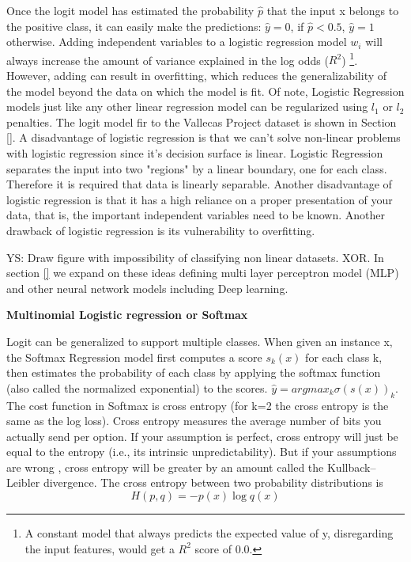 \documentclass[11pt]{article}
\theoremstyle{definition}
\theoremstyle{remark}
\begin{document}
{Once the logit model has estimated the probability $\hat{p}$ that the input x belongs to the positive class, it can easily make the predictions: $\hat{y} = 0$, if $\hat{p} < 0.5$, $\hat{y} = 1$ otherwise. Adding independent variables to a logistic regression model $w_i$ will always increase the amount of variance explained in the log odds ($R^2$) \footnote{A constant model that always predicts the expected value of y, disregarding the input features, would get a $R^2$ score of 0.0.}. However, adding can result in overfitting, which reduces the generalizability of the model beyond the data on which the model is fit. Of note, Logistic Regression models just like any other linear regression model can be regularized using $l_1$ or $l_2$ penalties. The logit model fir to the Vallecas Project dataset is shown in Section \ref{}.
A disadvantage of logistic regression is that we can’t solve non-linear problems with logistic regression since it’s decision surface is linear. 
Logistic Regression separates the input into two "regions" by a linear boundary, one for each class. Therefore it is required that data is linearly separable. Another disadvantage of logistic regression is that it has a high reliance on a proper presentation of your data, that is, the important independent variables need to be known. 
Another drawback of logistic regression is its vulnerability to overfitting.

YS: Draw figure with impossibility of classifying non linear datasets. XOR. In section \ref{} we expand on these ideas defining multi layer perceptron model (MLP) and other neural network models including Deep learning.

\textbf{Multinomial Logistic regression or Softmax}

Logit can be generalized to support multiple classes. When given an instance x, the Softmax Regression model first computes a score $s_{k}(x)$ for each class k, then estimates the probability of each class by applying the softmax function (also called the normalized exponential) to the scores. $\hat{y}= argmax_{k} \sigma(s(x))_k$. The cost function in Softmax is cross entropy (for k=2 the cross entropy is the same as the log loss). Cross entropy measures the average number of bits you actually send per option. If your assumption is perfect, cross entropy will just be equal to the entropy (i.e., its intrinsic unpredictability). But if your assumptions are wrong , cross entropy will be greater by an amount called the Kullback–Leibler divergence. The cross entropy between two probability distributions is 
\begin{equation}
H(p,q)= -p(x)\log q(x)
\label{eq:softmax}
\end{equation}

}
\end{document}
